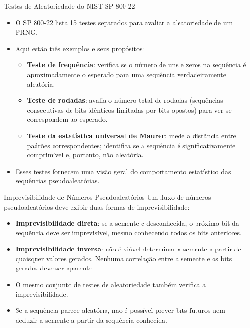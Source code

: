 \begin{frame}{Testes de Aleatoriedade do NIST SP 800-22}
    \begin{itemize}
        \item O SP 800-22 lista 15 testes separados para avaliar a aleatoriedade de um PRNG.
        \item Aqui estão três exemplos e seus propósitos:
              \begin{itemize}
                  \item \textbf{Teste de frequência}: verifica se o número de uns e zeros na sequência é aproximadamente o esperado para uma sequência verdadeiramente aleatória.
                  \item \textbf{Teste de rodadas}: avalia o número total de rodadas (sequências consecutivas de bits idênticos limitadas por bits opostos) para ver se correspondem ao esperado.
                  \item \textbf{Teste da estatística universal de Maurer}: mede a distância entre padrões correspondentes; identifica se a sequência é significativamente comprimível e, portanto, não aleatória.
              \end{itemize}
        \item Esses testes fornecem uma visão geral do comportamento estatístico das sequências pseudoaleatórias.
    \end{itemize}
\end{frame}


\begin{frame}{Imprevisibilidade de Números Pseudoaleatórios}
    Um fluxo de números pseudoaleatórios deve exibir duas formas de imprevisibilidade:

    \begin{itemize}
        \item \textbf{Imprevisibilidade direta}: se a semente é desconhecida, o próximo bit da sequência deve ser imprevisível, mesmo conhecendo todos os bits anteriores.
        \item \textbf{Imprevisibilidade inversa}: não é viável determinar a semente a partir de quaisquer valores gerados. Nenhuma correlação entre a semente e os bits gerados deve ser aparente.
    \end{itemize}

    \medskip

    \begin{itemize}
        \item O mesmo conjunto de testes de aleatoriedade também verifica a imprevisibilidade.
        \item Se a sequência parece aleatória, não é possível prever bits futuros nem deduzir a semente a partir da sequência conhecida.
    \end{itemize}
\end{frame}

